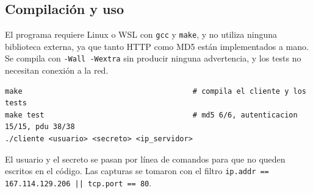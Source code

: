 \documentclass[11pt,a4paper]{article}
\newcommand{\code}[1]{\texttt{#1}}
\begin{document}
\subsection*{Compilación y uso}

El programa requiere Linux o WSL con \code{gcc} y \code{make}, y no utiliza ninguna biblioteca externa, ya que tanto HTTP como MD5 están implementados a mano. Se compila con \code{-Wall -Wextra} sin producir ninguna advertencia, y los tests no necesitan conexión a la red.

\begin{lstlisting}
make                                       # compila el cliente y los tests
make test                                  # md5 6/6, autenticacion 15/15, pdu 38/38
./cliente <usuario> <secreto> <ip_servidor>
\end{lstlisting}

El usuario y el secreto se pasan por línea de comandos para que no queden escritos en el código. Las capturas se tomaron con el filtro \code{ip.addr == 167.114.129.206 || tcp.port == 80}.
\end{document}
